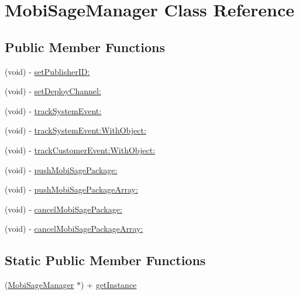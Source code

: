 \hypertarget{interface_mobi_sage_manager}{\section{\-Mobi\-Sage\-Manager \-Class \-Reference}
\label{interface_mobi_sage_manager}
}
\subsection*{\-Public \-Member \-Functions}
\begin{DoxyCompactItemize}
\item 
(void) -\/ \hyperlink{interface_mobi_sage_manager_af3e927d3c87219cd3a0b52c3c1ff4d47}{set\-Publisher\-I\-D\-:}
\item 
(void) -\/ \hyperlink{interface_mobi_sage_manager_a12c9afbad34d0129d8117578ef183c24}{set\-Deploy\-Channel\-:}
\item 
(void) -\/ \hyperlink{interface_mobi_sage_manager_ac9b224f48d44d5096932909c18f49ca1}{track\-System\-Event\-:}
\item 
(void) -\/ \hyperlink{interface_mobi_sage_manager_a1d87b794d6a8c4cb4324265fe5299d20}{track\-System\-Event\-:\-With\-Object\-:}
\item 
(void) -\/ \hyperlink{interface_mobi_sage_manager_a40846c70d91a9e49b76634ad3e416fd4}{track\-Customer\-Event\-:\-With\-Object\-:}
\item 
(void) -\/ \hyperlink{interface_mobi_sage_manager_a4f721203eb0198a9fc01ac636a45344f}{push\-Mobi\-Sage\-Package\-:}
\item 
(void) -\/ \hyperlink{interface_mobi_sage_manager_aaf59a45dc1100cfc18701f4c33aaaa40}{push\-Mobi\-Sage\-Package\-Array\-:}
\item 
(void) -\/ \hyperlink{interface_mobi_sage_manager_af5fdc494b6025a56d15cced4d6dd438d}{cancel\-Mobi\-Sage\-Package\-:}
\item 
(void) -\/ \hyperlink{interface_mobi_sage_manager_ab66e53e767c760669e7f0ca5b7ed9614}{cancel\-Mobi\-Sage\-Package\-Array\-:}
\end{DoxyCompactItemize}
\subsection*{\-Static \-Public \-Member \-Functions}
\begin{DoxyCompactItemize}
\item 
(\hyperlink{interface_mobi_sage_manager}{\-Mobi\-Sage\-Manager} $\ast$) + \hyperlink{interface_mobi_sage_manager_af279bbc365d374ce79d1a08798fe981e}{get\-Instance}
\end{DoxyCompactItemize}



